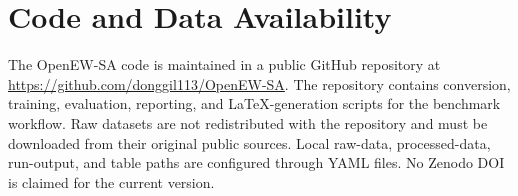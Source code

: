 \documentclass{ieeeaccess}
\begin{document}
\section{Code and Data Availability}

The OpenEW-SA code is maintained in a public GitHub repository at \url{https://github.com/donggil113/OpenEW-SA}. The repository contains conversion, training, evaluation, reporting, and LaTeX-generation scripts for the benchmark workflow. Raw datasets are not redistributed with the repository and must be downloaded from their original public sources. Local raw-data, processed-data, run-output, and table paths are configured through YAML files. No Zenodo DOI is claimed for the current version.



\end{document}
